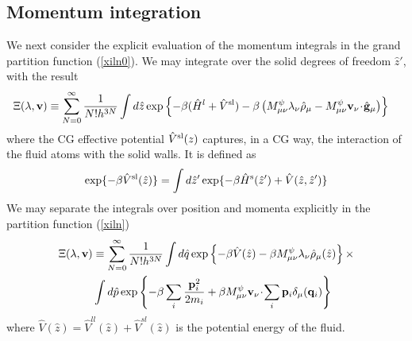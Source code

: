 \documentclass[b5paper,openright,11pt]{book}
\newcommand{\esc}{\!\cdot\!}
\begin{document}
\begin{appendices}
\section{Momentum integration}
We next consider the explicit  evaluation of the momentum integrals in
the grand partition function (\ref{xiln0}).  We may integrate over the
solid degrees of freedom $\hat{z}'$, with the result
\begin{align}
&\Xi(\lambda,{\bf v})
\equiv
 \sum_{N=0}^\infty \frac{1}{N!h^{3N}}
\int d\hat{z}
\exp\left\{-\beta (\hat{H}^l +\hat{V}^{\rm sl} )-\beta
\left(M^\psi_{\mu\nu}\lambda_\nu\hat{\rho}_{\mu} 
-M^\psi_{\mu\nu}{\bf v}_\nu\esc\hat{\bf g}_{\mu} \right)\right\}
\label{xiln}
\end{align}
where the CG effective potential $\hat{V}^{\rm sl}(z)$ captures, in a CG way, the interaction
of the fluid atoms with the solid walls. It is defined as
\begin{align}
  \exp\{-\beta \hat{V}^{\rm sl}(\hat{z})\}=\int d\hat{z}' 
  \exp\{-\beta \hat{H}^{\rm s}(\hat{z}')+\hat{V}(\hat{z},\hat{z}')\}
\end{align}
We may separate the integrals over position and momenta explicitly in  the partition
function  (\ref{xiln})
\begin{align}
\Xi(\lambda,{\bf v})
&\equiv
 \sum_{N=0}^\infty \frac{1}{N!h^{3N}}
\int d\hat{q}
\exp\left\{-\beta \hat{V}(\hat{z})-\beta
M^\psi_{\mu\nu}\lambda_\nu\hat{\rho}_{\mu}(\hat{z})\right\}
\times \nonumber \\
&\int d\hat{p}
\exp\left\{-\beta\sum_i\frac{{\bf p}_i^2}{2m_i}+\beta M^\psi_{\mu\nu}{\bf v}_\nu\esc\sum_i{\bf p}_i\delta_\mu({\bf q}_i)\right\}
\label{xiln2}
\end{align}
where $\hat{V}(\hat{z})=\hat{V}^{ll}(\hat{z})+\hat{V}^{sl}(\hat{z})$ is the potential energy of the fluid. 


\end{appendices}
\end{document}
